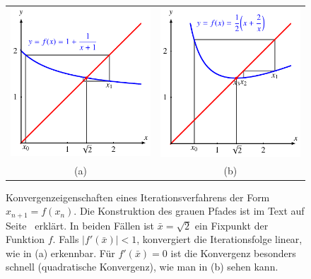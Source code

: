 \begin{figure}
\centering
\begin{tabular}{cc}
\includegraphics{chapters/1a-frames/images/ibkonv.pdf}&
\includegraphics{chapters/1a-frames/images/itkonv.pdf}\\
(a)&(b)
\end{tabular}
\caption{Konvergenzeigenschaften eines Iterationsverfahrens der Form
$x_{n+1}=f(x_n)$.
Die Konstruktion des grauen Pfades ist im Text auf
Seite~\pageref{frame:grauerpfad} erklärt.
In beiden Fällen ist $\bar{x}=\sqrt{2}$ ein Fixpunkt der Funktion $f$.
Falls $|f'(\bar{x})| < 1$, konvergiert die Iterationsfolge linear, wie in (a)
erkennbar.
Für $f'(\bar{x})=0$ ist die Konvergenz besonders schnell (quadratische
Konvergenz), wie man in (b) sehen kann.
\label{frame:iterationsvergleich}}
\end{figure}

